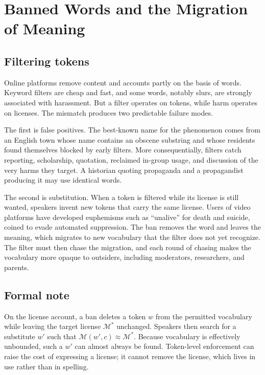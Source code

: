 \documentclass[11pt,a4paper]{article}
\theoremstyle{plain}
\theoremstyle{definition}
\theoremstyle{remark}
\newcommand{\M}{\mathcal{M}}
\begin{document}
\section{Banned Words and the Migration of Meaning}

\subsection{Filtering tokens}

Online platforms remove content and accounts partly on the basis of words. Keyword filters are cheap and fast, and some words, notably slurs, are strongly associated with harassment. But a filter operates on tokens, while harm operates on licenses. The mismatch produces two predictable failure modes.

The first is false positives. The best-known name for the phenomenon comes from an English town whose name contains an obscene substring and whose residents found themselves blocked by early filters. More consequentially, filters catch reporting, scholarship, quotation, reclaimed in-group usage, and discussion of the very harms they target. A historian quoting propaganda and a propagandist producing it may use identical words.

The second is substitution. When a token is filtered while its license is still wanted, speakers invent new tokens that carry the same license. Users of video platforms have developed euphemisms such as ``unalive'' for death and suicide, coined to evade automated suppression. The ban removes the word and leaves the meaning, which migrates to new vocabulary that the filter does not yet recognize. The filter must then chase the migration, and each round of chasing makes the vocabulary more opaque to outsiders, including moderators, researchers, and parents.

\subsection{Formal note}

On the license account, a ban deletes a token $w$ from the permitted vocabulary while leaving the target license $\M^\ast$ unchanged. Speakers then search for a substitute $w'$ such that $\M(w',c) \approx \M^\ast$. Because vocabulary is effectively unbounded, such a $w'$ can almost always be found. Token-level enforcement can raise the cost of expressing a license; it cannot remove the license, which lives in use rather than in spelling.
\end{document}
